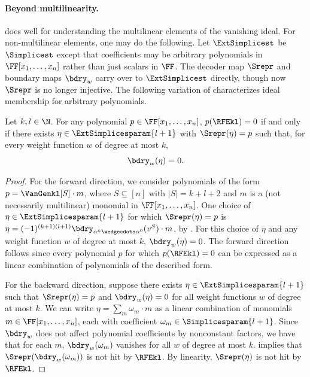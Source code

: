 \documentclass{toc}
\begin{document}
\paragraph{Beyond multilinearity.}
does well for understanding the multilinear elements of the vanishing ideal.
For non-multilinear elements, one may do the following.
Let \(\ExtSimplicest\) be \(\Simplicest\) except that coefficients may be
arbitrary polynomials in \(\FF[x_1,\ldots,x_n]\) rather than just scalars in
\(\FF\).
The decoder map \(\Srepr\) and boundary maps \(\bdry_w\) carry over
to \(\ExtSimplicest\) directly,
though now \(\Srepr\) is no longer injective.
The following variation of 
characterizes ideal membership for arbitrary polynomials.
\begin{proposition}
  \label{prop.vanideal-char.base-lift}
  Let \(k,l \in \N\).
  For any polynomial \(p\in\FF[x_1,\ldots,x_n]\),
  \(p(\RFEkl) = 0\) if and only if
  there exists \(\eta\in\ExtSimplicesparam{l+1}\)
  with \(\Srepr(\eta) = p\) such that,
  for every weight function $w$ of degree at most \(k\),
  \[
    \bdry_w(\eta) = 0.
  \]
\end{proposition}

\begin{proof}
    For the forward direction, we consider polynomials of the form $p= \VanGenkl[S] \cdot m$, where $S \subseteq [n]$ with $|S|=k+l+2$ and $m$ is a (not necessarily multilinear) monomial in $\FF[x_1,\dots,x_n]$. One choice of $\eta\in \ExtSimplicesparam{l+1}$ for which $\Srepr(\eta)=p$ is $\eta=(-1)^{(k+1)(l+1)} \bdry_{\alpha^k\wedgecdots\alpha^0}(v^S) \cdot m$, by . For this choice of $\eta$ and any weight function $w$ of degree at most $k$, $\bdry_{w}(\eta)=0$. The forward direction follows since every polynomial $p$ for which $p(\RFEkl)=0$ can be expressed as a linear combination of polynomials of the described form.

    For the backward direction, suppose there exists $\eta\in \ExtSimplicesparam{l+1}$ such that $\Srepr(\eta)=p$ and $\bdry_w(\eta)=0$ for all weight functions $w$ of degree at most $k$. We can write $\eta = \sum_m \omega_m 
    \cdot m$ as a linear combination of monomials $m\in \FF[x_1,\dots,x_n]$, each with coefficient $\omega_m\in \Simplicesparam{l+1}$. Since $\bdry_w$ does not affect polynomial coefficients by nonconstant factors, we have that for each $m$, $\bdry_w(\omega_m)$ vanishes for all $w$ of degree at most $k$.  implies that $\Srepr(\bdry_w(\omega_m))$ is not hit by $\RFEkl$. By linearity, $\Srepr(\eta)$ is not hit by $\RFEkl$.
\end{proof}
\end{document}
